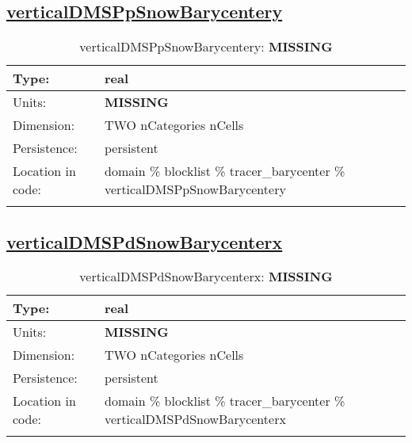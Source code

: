 \subsection[verticalDMSPpSnowBarycentery]{\hyperref[sec:var_tab_tracer_barycenter]{verticalDMSPpSnowBarycentery}}
\label{subsec:var_sec_tracer_barycenter_verticalDMSPpSnowBarycentery}
\begin{center}
\begin{longtable}{| p{2.0in} | p{4.0in} |}
        \hline 
        Type: & real \\
        \hline 
        Units: & {\bf \color{red} MISSING} \\
        \hline 
        Dimension: & TWO nCategories nCells \\
        \hline 
        Persistence: & persistent \\
        \hline 
         Location in code: & domain \% blocklist \% tracer\_barycenter \% verticalDMSPpSnowBarycentery \\
         \hline 
    \caption{verticalDMSPpSnowBarycentery: {\bf \color{red} MISSING}}
\end{longtable}
\end{center}
\subsection[verticalDMSPdSnowBarycenterx]{\hyperref[sec:var_tab_tracer_barycenter]{verticalDMSPdSnowBarycenterx}}
\label{subsec:var_sec_tracer_barycenter_verticalDMSPdSnowBarycenterx}
\begin{center}
\begin{longtable}{| p{2.0in} | p{4.0in} |}
        \hline 
        Type: & real \\
        \hline 
        Units: & {\bf \color{red} MISSING} \\
        \hline 
        Dimension: & TWO nCategories nCells \\
        \hline 
        Persistence: & persistent \\
        \hline 
         Location in code: & domain \% blocklist \% tracer\_barycenter \% verticalDMSPdSnowBarycenterx \\
         \hline 
    \caption{verticalDMSPdSnowBarycenterx: {\bf \color{red} MISSING}}
\end{longtable}
\end{center}
